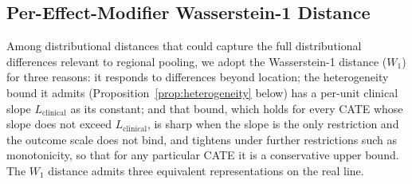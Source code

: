 \documentclass[AMA,Times1COL]{WileyNJDv5}
\begin{document}
\subsection{Per-Effect-Modifier Wasserstein-1 Distance}\label{sec:nabcd_metric}

Among distributional distances that could capture the full distributional differences relevant to regional pooling, we adopt the Wasserstein-1 distance ($W_1$) for three reasons: it responds to differences beyond location; the heterogeneity bound it admits (Proposition~\ref{prop:heterogeneity} below) has a per-unit clinical slope $L_{\text{clinical}}$ as its constant; and that bound, which holds for every CATE whose slope does not exceed $L_{\text{clinical}}$, is sharp when the slope is the only restriction and the outcome scale does not bind, and tightens under further restrictions such as monotonicity, so that for any particular CATE it is a conservative upper bound. The $W_1$ distance admits three equivalent representations on the real line.\cite{villani2009,vallender1974}
\end{document}

